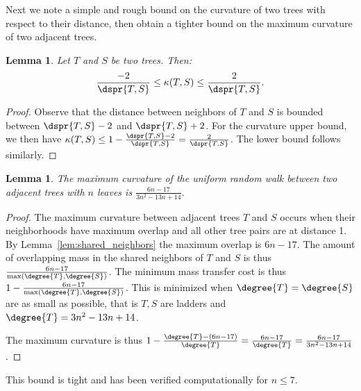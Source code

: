 \documentclass[11pt,onecolumn,conference]{IEEEtran}
\newtheorem{lemma}[theorem]{Lemma}
\newcommand{\curvature}[2][]{%
    \ifthenelse{\equal{#1}{}}%
		{\kappa(#2)}%
		{\kappa_{#1}(#2)}%
}
\begin{document}
Next we note a simple and rough bound on the curvature of two trees with respect to their distance, then obtain a tighter bound on the maximum curvature of two adjacent trees.

\begin{lemma}
	\label{lem:curvature_distance_bound}
	Let $T$ and $S$ be two trees. Then:
	$$ \frac{-2}{\dspr{T,S}} \le \curvature{T,S} \le \frac{2}{\dspr{T,S}} .$$
\end{lemma}
\begin{proof}
	Observe that the distance between neighbors of $T$ and $S$ is bounded between $\dspr{T,S} - 2$ and $\dspr{T,S} + 2$.
	For the curvature upper bound, we then have $\curvature{T,S} \le 1 - \frac{\dspr{T,S} - 2}{\dspr{T,S}} = \frac{2}{\dspr{T,S}}$.
	The lower bound follows similarly.
\end{proof}

\begin{lemma}
	The maximum curvature of the uniform random walk between two adjacent trees with $n$ leaves is $\frac{6n-17}{3n^2-13n+14}$.
\end{lemma}
\begin{proof}
The maximum curvature between adjacent trees $T$ and $S$ occurs when their neighborhoods have maximum overlap and all other tree pairs are at distance 1.
By Lemma~\ref{lem:shared_neighbors} the maximum overlap is $6n-17$.
The amount of overlapping mass in the shared neighbors of $T$ and $S$ is thus $\frac{6n-17}{\max(\degree{T},\degree{S})}$.
The minimum mass transfer cost is thus $1 - \frac{6n-17}{\max(\degree{T},\degree{S})}$.
This is minimized when $\degree{T}=\degree{S}$ are as small as possible, that is $T,S$ are ladders and $\degree{T} = 3n^2 - 13n + 14$.

The maximum curvature is thus $1 - \frac{\degree{T} - (6n-17)}{\degree{T}} = \frac{6n - 17}{\degree{T}}= \frac{6n-17}{3n^2-13n+14}$.
\end{proof}
This bound is tight and has been verified computationally for $n \le 7$.
\end{document}
